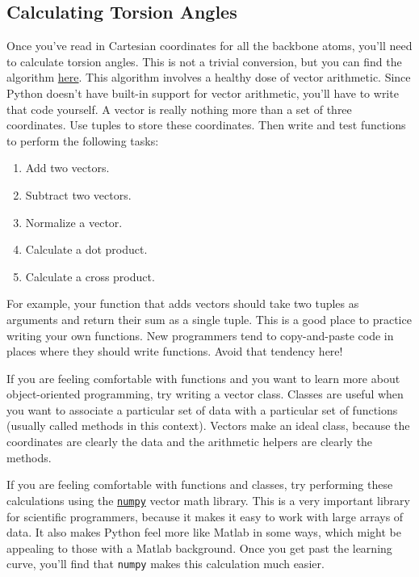 \documentclass{article}
\newcommand{\module}[2]{\href{#2}{\texttt{#1}}}
\begin{document}
\subsection{Calculating Torsion Angles}

Once you've read in Cartesian coordinates for all the backbone atoms, you'll 
need to calculate torsion angles.  This is not a trivial conversion, but you 
can find the algorithm 
\href{http://math.stackexchange.com/questions/47059/how-do-i-calculate-a-dihedral-angle-given-cartesian-coordinates}{here}.  
This algorithm involves a healthy dose of vector arithmetic.  Since Python 
doesn't have built-in support for vector arithmetic, you'll have to write that 
code yourself.  A vector is really nothing more than a set of three coordinates.  Use tuples to 
store these coordinates.  Then write and test functions to perform the 
following tasks:

\begin{enumerate}
 \item Add two vectors.
 \item Subtract two vectors.
 \item Normalize a vector.
 \item Calculate a dot product.
 \item Calculate a cross product.
\end{enumerate}

For example, your function that adds vectors should take two tuples as 
arguments and return their sum as a single tuple.  This is a good place to 
practice writing your own functions.  New programmers tend to copy-and-paste 
code in places where they should write functions.  Avoid that tendency here!

If you are feeling comfortable with functions and you want to learn more about 
object-oriented programming, try writing a vector class.  Classes are useful 
when you want to associate a particular set of data with a particular set of 
functions (usually called methods in this context).  Vectors make an ideal 
class, because the coordinates are clearly the data and the arithmetic helpers 
are clearly the methods.

If you are feeling comfortable with functions and classes, try performing these 
calculations using the 
\module{numpy}{http://wiki.scipy.org/Tentative_NumPy_Tutorial} vector math 
library.  This is a very important library for scientific programmers, because 
it makes it easy to work with large arrays of data.  It also makes Python feel 
more like Matlab in some ways, which might be appealing to those with a Matlab 
background.  Once you get past the learning curve, you'll find that 
\texttt{numpy} makes this calculation much easier.
\end{document}
